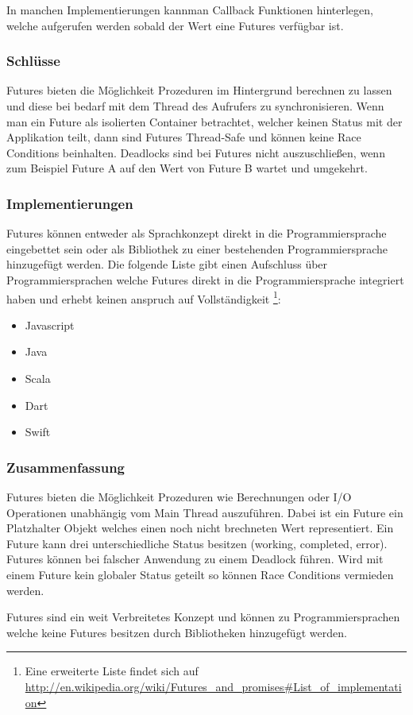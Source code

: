 In manchen Implementierungen kannman Callback Funktionen hinterlegen, welche aufgerufen werden sobald der Wert eine Futures verfügbar ist. 

\subsubsection{Schlüsse}
Futures bieten die Möglichkeit Prozeduren im Hintergrund berechnen zu lassen und diese bei bedarf mit dem Thread des Aufrufers zu synchronisieren. Wenn man ein Future als isolierten Container betrachtet, welcher keinen Status mit der Applikation teilt, dann sind Futures Thread-Safe und können keine Race Conditions beinhalten. Deadlocks sind bei Futures nicht auszuschließen, wenn zum Beispiel Future A auf den Wert von Future B wartet und umgekehrt.

\subsubsection{Implementierungen}
Futures können entweder als Sprachkonzept direkt in die Programmiersprache eingebettet sein oder als Bibliothek zu einer bestehenden Programmiersprache hinzugefügt werden. Die folgende Liste gibt einen Aufschluss über Programmiersprachen welche Futures direkt in die Programmiersprache integriert haben und erhebt keinen anspruch auf Vollständigkeit \footnote{Eine erweiterte Liste findet sich auf \url{http://en.wikipedia.org/wiki/Futures_and_promises#List_of_implementation}}:

\begin{itemize}
  \item Javascript
  \item Java
  \item Scala
  \item Dart
  \item Swift
\end{itemize}  

\subsubsection{Zusammenfassung}
Futures bieten die Möglichkeit Prozeduren wie Berechnungen oder I/O Operationen unabhängig vom Main Thread auszuführen. Dabei ist ein Future ein Platzhalter Objekt welches einen noch nicht brechneten Wert representiert. Ein Future kann drei unterschiedliche Status besitzen (working, completed, error). Futures können bei falscher Anwendung zu einem Deadlock führen. Wird mit einem Future kein globaler Status geteilt so können Race Conditions vermieden werden. 

Futures sind ein weit Verbreitetes Konzept und können zu Programmiersprachen welche keine Futures besitzen durch Bibliotheken hinzugefügt werden.